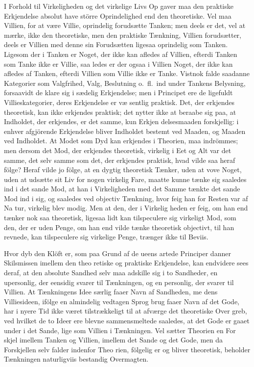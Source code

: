 \documentclass[12pt,a4paper]{article}
\newcommand{\opage}[1]{\marginnote{\footnotesize\textit{[#1]}}}
\begin{document}
I Forhold til Virkeligheden og det virkelige Livs Op\-%
gaver maa den praktiske Erkjendelse absolut have större
Oprindelighed end den theoretiske. Vel maa Villien, for
at være Villie, oprindelig forudsætte Tanken; men deels
er det, vel at mærke, ikke den theoretiske, men den
praktiske Tænkning, Villien forudsætter, deels er Villien
med denne sin Forudsætten ligesaa oprindelig som Tanken.
Ligesom der i Tanken er Noget, der ikke kan afledes af
\opage{69}Villien, efterdi Tanken som Tanke ikke er Villie, saa\-%
ledes er der ogsaa i Villien Noget, der ikke kan afledes
af Tanken, efterdi Villien som Villie ikke er Tanke.
Vistnok falde saadanne Kategorier som Valgfrihed, Valg,
Beslutning o.\ fl.\ ind under Tankens Belysning, forsaavidt
de klare sig i sædelig Erkjendelse; men i Principet ere
de ligefuldt Villieskategorier, deres Erkjendelse er væ\-%
sentlig praktisk. Det, der erkjendes theoretisk, kan ikke
erkjendes praktisk; det nytter ikke at beraabe sig paa,
at Indholdet, der erkjendes, er det samme, kun Erkjen\-%
delsesmaaden forskjellig: i enhver afgjörende Erkjendelse
bliver Indholdet bestemt ved Maaden, og Maaden ved
Indholdet. At Modet som Dyd kan erkjendes i Theorien,
maa indrömmes; men dersom det Mod, der erkjendes
theoretisk, virkelig i Eet og Alt var det samme, det selv\-%
samme som det, der erkjendes praktisk, hvad vilde saa
heraf fölge? Heraf vilde jo fölge, at en dygtig theoretisk
Tænker, uden at vove Noget, uden at udsætte sit Liv
for nogen virkelig Fare, maatte kunne tænke sig saaledes
ind i det sande Mod, at han i Virkeligheden med det
Samme tænkte det sande Mod ind i sig, og saaledes ved
objectiv Tænkning, hvor feig han for Resten var af Na\-%
tur, virkelig blev modig. Men at den, der i Virkelig\-%
heden er feig, om han end tænker nok saa theoretisk,
ligesaa lidt kan tilspeculere sig virkeligt Mod, som den,
der er uden Penge, om han end vilde tænke theoretisk
objectivt, til han revnede, kan tilspeculere sig virkelige
Penge, trænger ikke til Beviis.

Hvor dyb den Klöft er, som paa Grund af de ueens\-%
artede Principer danner Skilsmissen imellem den theo\-%
retiske og praktiske Erkjendelse, kan endvidere sees
deraf, at den absolute Sandhed selv maa adskille sig i
to Sandheder, en upersonlig, der eensidig svarer til
Tænkningen, og en personlig, der svarer til Villien. At
Tænkningens Idee særlig faaer Navn af Sandheden, me\-%
dens Villiesideen, ifölge en almindelig vedtagen Sprog\-%
\opage{70}brug faaer Navn af det Gode, har i nyere Tid ikke
været tilstrækkeligt til at afværge det theoretiske Over\-%
greb, ved hvilket de to Ideer ere blevne sammensmeltede
saaledes, at det Gode er gaaet under i det Sande, lige\-%
som Villien i Tænkningen. Vel sætter Theorien en For\-%
skjel imellem Tanken og Villien, imellem det Sande og
det Gode, men da Forskjellen selv falder indenfor Theo\-%
rien, fölgelig er og bliver theoretisk, beholder Tænkningen
naturligviis bestandig Overmagten.
\end{document}
